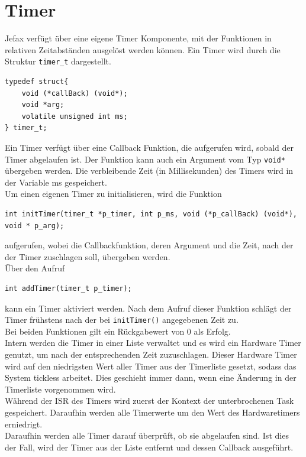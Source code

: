 \documentclass[fontsize=12pt, toc=bibliography, notitlepage]{scrreprt}
\begin{document}
\chapter{Timer}
\label{chap:timer}
Jefax verfügt über eine eigene Timer Komponente, mit der Funktionen in relativen Zeitabständen ausgelöst werden können. Ein Timer wird durch die Struktur \lstinline$timer_t$ dargestellt.

\begin{lstlisting}[title=timer.h]
typedef struct{
	void (*callBack) (void*);
	void *arg;
	volatile unsigned int ms;
} timer_t;
\end{lstlisting}

Ein Timer verfügt über eine Callback Funktion, die aufgerufen wird, sobald der Timer abgelaufen ist. Der Funktion kann auch ein Argument vom Typ \lstinline$void*$ übergeben werden. Die verbleibende Zeit (in Millisekunden) des Timers wird in der Variable ms gespeichert.\\

Um einen eigenen Timer zu initialisieren, wird die Funktion

\begin{lstlisting}[title=timer.h]
int initTimer(timer_t *p_timer, int p_ms, void (*p_callBack) (void*), void * p_arg);
\end{lstlisting}

aufgerufen, wobei die Callbackfunktion, deren Argument und die Zeit, nach der der Timer zuschlagen soll, übergeben werden.\\
Über den Aufruf

\begin{lstlisting}[title=timer.h]
int addTimer(timer_t p_timer);
\end{lstlisting}

kann ein Timer aktiviert werden. Nach dem Aufruf dieser Funktion schlägt der Timer frühstens nach der bei \lstinline$initTimer()$ angegebenen Zeit zu.\\
Bei beiden Funktionen gilt ein Rückgabewert von 0 als Erfolg.\\
Intern werden die Timer in einer Liste verwaltet und es wird ein Hardware Timer genutzt, um nach der entsprechenden Zeit zuzuschlagen. Dieser Hardware Timer wird auf den niedrigsten Wert aller Timer aus der Timerliste gesetzt, sodass das System tickless arbeitet. Dies geschieht immer dann, wenn eine Änderung in der Timerliste vorgenommen wird.\\
Während der ISR des Timers wird zuerst der Kontext der unterbrochenen Task gespeichert. Daraufhin werden alle Timerwerte um den Wert des Hardwaretimers erniedrigt.\\
Daraufhin werden alle Timer darauf überprüft, ob sie abgelaufen sind. Ist dies der Fall, wird der Timer aus der Liste entfernt und dessen Callback ausgeführt.\\
\end{document}
